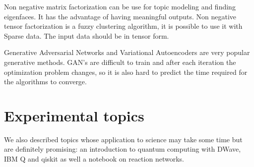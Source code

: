 \documentclass[11pt,letterpaper]{report}
\begin{document}
Non negative matrix factorization can be use for topic modeling and finding eigenfaces. It has the advantage of having meaningful outputs\cite{Lee1999}. Non negative tensor factorization is a fuzzy clustering algorithm, it is possible to use it with   Sparse data\cite{Ho2014a}. The input data should be in tensor form.

Generative Adversarial Networks and Variational Autoencoders are very popular generative methods. GAN's are difficult to train and after each iteration the optimization problem changes, so it is also hard to predict the time required for the algorithms to converge. 


\section{Experimental topics}We also described topics whose application to science may take some time but are definitely promising: an introduction to quantum computing with DWave, IBM Q and qiskit as well a notebook on reaction networks.
	
	
	
	
	
	
\end{document}
